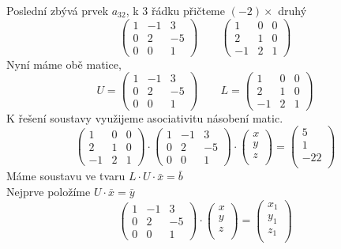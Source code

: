 Poslední zbývá prvek $a_{32}$, k $3$ řádku přičteme $(-2)\times$ druhý
$$
\begin{pmatrix}
  1  & -1 & 3   \\
  0  & 2 & -5   \\
  0 & 0  & 1
\end{pmatrix}
\qquad
\begin{pmatrix}
  1 & 0 & 0 \\
  2 & 1 & 0 \\
  -1 & 2 & 1 
\end{pmatrix}
$$
Nyní máme obě matice,
$$
U =
\begin{pmatrix}
  1  & -1 & 3   \\
  0  & 2 & -5   \\
  0 & 0  & 1
\end{pmatrix}
\qquad
L =
\begin{pmatrix}
  1 & 0 & 0 \\
  2 & 1 & 0 \\
  -1 & 2 & 1 
\end{pmatrix}
$$
K řešení soustavy využijeme asociativitu násobení matic.
$$
\begin{pmatrix}
  1 & 0 & 0 \\
  2 & 1 & 0 \\
  -1 & 2 & 1 
\end{pmatrix}
\cdot
\begin{pmatrix}
  1  & -1 & 3   \\
  0  & 2 & -5   \\
  0 & 0  & 1
\end{pmatrix}
\cdot
\begin{pmatrix}
  x \\
  y \\
  z \\
\end{pmatrix}
=
\begin{pmatrix}
  5 \\
  1 \\
  -22 \\
\end{pmatrix}
$$
Máme soustavu ve tvaru $L \cdot U \cdot \bar x = \bar b$ \\
Nejprve položíme $U\cdot \bar x = \bar y$
$$
\begin{pmatrix}
  1  & -1 & 3   \\
  0  & 2 & -5   \\
  0 & 0  & 1
\end{pmatrix}
\cdot
\begin{pmatrix}
  x \\
  y \\
  z \\
\end{pmatrix}
=
\begin{pmatrix}
  x_1 \\
  y_1 \\
  z_1 \\
\end{pmatrix}
$$
